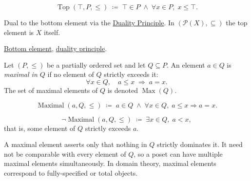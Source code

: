 \begin{remark*}
\[
\operatorname{Top}(\top, P, \leq)
\;\coloneqq\;
\top \in P \;\land\; \forall x \in P,\; x \leq \top.
\]
\end{remark*}

\begin{remark*}[Interpretation]
Dual to the bottom element via the
\hyperref[prop:duality-principle]{Duality Principle}.
In $(\mathcal{P}(X), \subseteq)$ the top element is $X$ itself.
\end{remark*}

\begin{remark*}[Dependencies]
\hyperref[def:bottom-element]{Bottom element},
\hyperref[prop:duality-principle]{duality principle}.
\end{remark*}


\begin{definition}
\label{def:maximal-element}
Let $(P, \leq)$ be a partially ordered set and let $Q \subseteq P$.  An
element $a \in Q$ is \emph{maximal in $Q$} if no element of $Q$ strictly
exceeds it:
\[
\forall x \in Q, \quad a \leq x \;\Longrightarrow\; a = x.
\]
The set of maximal elements of $Q$ is denoted $\operatorname{Max}(Q)$.
\end{definition}

\begin{remark*}
\[
\operatorname{Maximal}(a, Q, \leq)
\;\coloneqq\;
a \in Q \;\land\; \forall x \in Q,\; a \leq x \Rightarrow a = x.
\]
\end{remark*}

\begin{remark*}
\[
\neg\operatorname{Maximal}(a, Q, \leq)
\;\coloneqq\;
\exists x \in Q,\; a < x,
\]
that is, some element of $Q$ strictly exceeds $a$.
\end{remark*}

\begin{remark*}[Interpretation]
A maximal element asserts only that nothing in $Q$ strictly dominates it.
It need not be comparable with every element of $Q$, so a poset can have
multiple maximal elements simultaneously.  In domain theory, maximal
elements correspond to fully-specified or total objects.
\end{remark*}

